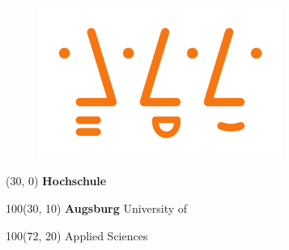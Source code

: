 \begin{titlepage}
\begin{figure}[htb]
\centering
\includegraphics[width=8cm]{images/hsaugsburglogo.png}
\label{Logo}
\end{figure}

\setlength{\TPHorizModule}{1mm}
\setlength{\TPVertModule}{1mm}


\begin{textblock}{50}(30, 0)
\Huge \textbf{Hochschule} 
\end{textblock}

\begin{textblock}{100}(30, 10)
\Huge \textbf{Augsburg} University of 
\end{textblock}

\begin{textblock}{100}(72, 20)
\Huge Applied Sciences 
\end{textblock}
\end{titlepage}